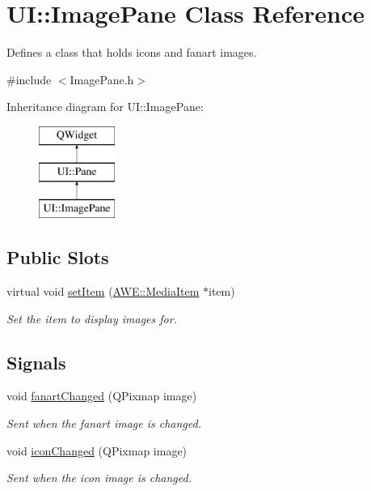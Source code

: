 \hypertarget{class_u_i_1_1_image_pane}{\section{U\-I\-:\-:Image\-Pane Class Reference}
\label{class_u_i_1_1_image_pane}
}


Defines a class that holds icons and fanart images.  




{\ttfamily \#include $<$Image\-Pane.\-h$>$}

Inheritance diagram for U\-I\-:\-:Image\-Pane\-:\begin{figure}[H]
\begin{center}
\leavevmode
\includegraphics[height=3.000000cm]{class_u_i_1_1_image_pane}
\end{center}
\end{figure}
\subsection*{Public Slots}
\begin{DoxyCompactItemize}
\item 
virtual void \hyperlink{class_u_i_1_1_image_pane_a1f1351fdd0de78875bdd6d8a4a2aa2a3}{set\-Item} (\hyperlink{class_a_w_e_1_1_media_item}{A\-W\-E\-::\-Media\-Item} $\ast$item)
\begin{DoxyCompactList}\small\item\em Set the item to display images for. \end{DoxyCompactList}\end{DoxyCompactItemize}
\subsection*{Signals}
\begin{DoxyCompactItemize}
\item 
void \hyperlink{class_u_i_1_1_image_pane_ad51420f7fd9e23cc29fdf370fcb5ec81}{fanart\-Changed} (Q\-Pixmap image)
\begin{DoxyCompactList}\small\item\em Sent when the fanart image is changed. \end{DoxyCompactList}\item 
void \hyperlink{class_u_i_1_1_image_pane_a7103b1d346c39b8e32cb02ee6c329ef5}{icon\-Changed} (Q\-Pixmap image)
\begin{DoxyCompactList}\small\item\em Sent when the icon image is changed. \end{DoxyCompactList}\end{DoxyCompactItemize}
